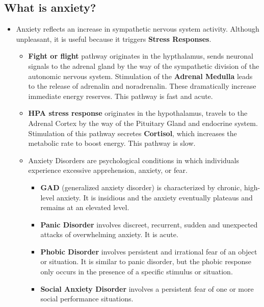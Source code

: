 \documentclass[10pt,letter]{article}
\theoremstyle{plain}
\theoremstyle{definition}
\begin{document}
\subsection*{What is anxiety?}
\begin{itemize}
    \item Anxiety reflects an increase in sympathetic nervous system activity. Although unpleasant, it is useful because it triggers \textbf{Stress Responses}. \begin{itemize}
        \item \textbf{Fight or flight} pathway originates in the hypthalamus, sends neuronal signals to the adrenal gland by the way of the sympathetic division of the autonomic nervous system. Stimulation of the \textbf{Adrenal Medulla} leads to the release of adrenalin and noradrenalin. These dramatically increase immediate energy reserves. This pathway is fast and acute.
        \item \textbf{HPA stress response} originates in the hypothalamus, travels to the Adrenal Cortex by the way of the Pituitary Gland and endocrine system. Stimulation of this pathway secretes \textbf{Cortisol}, which increases the metabolic rate to boost energy. This pathway is slow.
        \item Anxiety Disorders are psychological conditions in which individuals experience excessive apprehension, anxiety, or fear. \begin{itemize}
            \item \textbf{GAD} (generalized anxiety disorder) is characterized by chronic, high-level anxiety. It is insidious and the anxiety eventually plateaus and remains at an elevated level. 
            \item \textbf{Panic Disorder} involves discreet, recurrent, sudden and unexpected attacks of overwhelming anxiety. It is acute. 
            \item \textbf{Phobic Disorder} involves persistent and irrational fear of an object or situation. It is similar to panic disorder, but the phobic response only occurs in the presence of a specific stimulus or situation. 
            \item \textbf{Social Anxiety Disorder} involves a persistent fear of one or more social performance situations. 
        \end{itemize}
    \end{itemize}
\end{itemize}
\end{document}
